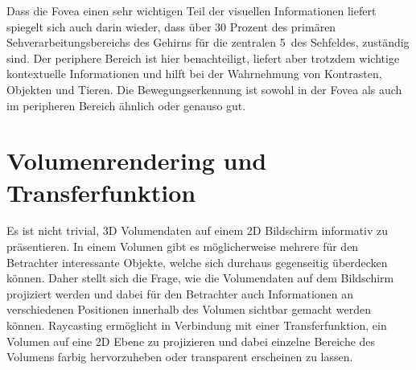 Dass die Fovea einen sehr wichtigen Teil der visuellen Informationen liefert spiegelt sich auch darin wieder, dass über 30 Prozent des primären Sehverarbeitungsbereichs des Gehirns für die zentralen 5\,\textdegree{} des Sehfeldes, zuständig sind.
Der periphere Bereich ist hier benachteiligt, liefert aber trotzdem wichtige kontextuelle Informationen und hilft bei der Wahrnehmung von Kontrasten, Objekten und Tieren.
Die Bewegungserkennung ist sowohl in der Fovea als auch im peripheren Bereich ähnlich oder genauso gut.

\section{Volumenrendering und Transferfunktion}\label{sec::voltff}
Es ist nicht trivial, 3D Volumendaten auf einem 2D Bildschirm informativ zu präsentieren.
In einem Volumen gibt es möglicherweise mehrere für den Betrachter interessante Objekte, welche sich durchaus gegenseitig überdecken können.
Daher stellt sich die Frage, wie die Volumendaten auf dem Bildschirm projiziert werden und dabei für den Betrachter auch Informationen an verschiedenen Positionen innerhalb des Volumen sichtbar gemacht werden können.
Raycasting ermöglicht in Verbindung mit einer Transferfunktion, ein Volumen auf eine 2D Ebene zu projizieren und dabei einzelne Bereiche des Volumens farbig hervorzuheben oder transparent erscheinen zu lassen.

